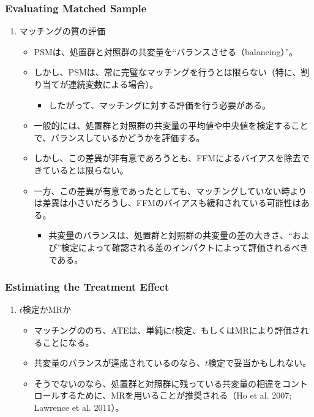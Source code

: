\subsubsection*{Evaluating Matched Sample}
\begin{enumerate}
 \item マッチングの質の評価
  \begin{itemize}
   \item PSMは、処置群と対照群の共変量を``バランスさせる（balancing）''。
   \item しかし、PSMは、常に完璧なマッチングを行うとは限らない（特に、割り当てが連続変数による場合）。
    \begin{itemize}
     \item したがって、マッチングに対する評価を行う必要がある。
    \end{itemize}
   \item 一般的には、処置群と対照群の共変量の平均値や中央値を検定することで、バランスしているかどうかを評価する。
   \item しかし、この差異が非有意であろうとも、FFMによるバイアスを除去できているとは限らない。
   \item 一方、この差異が有意であったとしても、マッチングしていない時よりは差異は小さいだろうし、FFMのバイアスも緩和されている可能性はある。
    \begin{itemize}
     \item 共変量のバランスは、処置群と対照群の共変量の差の大きさ、``および''検定によって確認される差のインパクトによって評価されるべきである。
    \end{itemize}
  \end{itemize}
\end{enumerate}
 
\subsubsection*{Estimating the Treatment Effect}
\begin{enumerate}
 \item $t$検定かMRか
   \begin{itemize}
    \item マッチングののち、ATEは、単純に$t$検定、もしくはMRにより評価されることになる。
    \item 共変量のバランスが達成されているのなら、$t$検定で妥当かもしれない。
    \item そうでないのなら、処置群と対照群に残っている共変量の相違をコントロールするために、MRを用いることが推奨される（Ho et al. 2007; Lawrence et al. 2011）。
   \end{itemize}
\end{enumerate}
